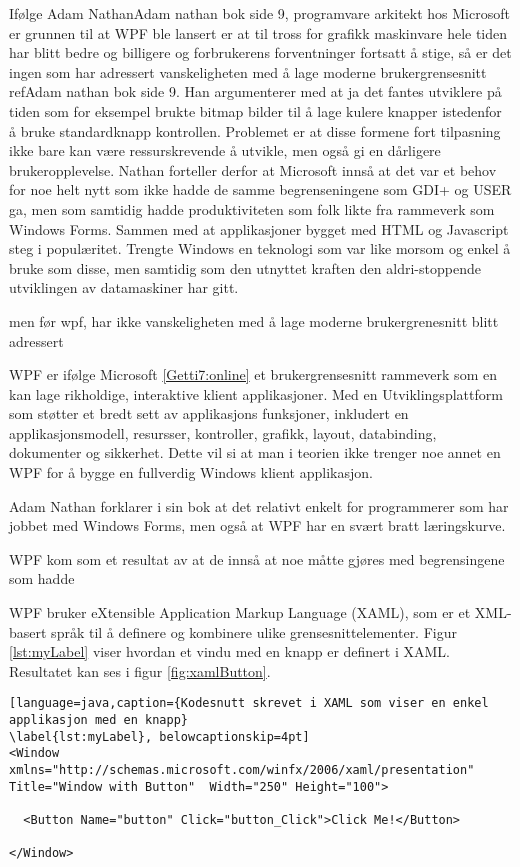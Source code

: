Ifølge Adam Nathan{Adam nathan bok side 9}, programvare arkitekt hos Microsoft er grunnen til at WPF ble lansert er at til tross for grafikk maskinvare hele tiden har blitt bedre og billigere og  forbrukerens forventninger fortsatt å stige, så er det ingen som har adressert vanskeligheten med å lage moderne brukergrensesnitt ref{Adam nathan bok side 9}.  Han argumenterer med at ja det fantes utviklere på tiden som for eksempel brukte bitmap bilder til å lage kulere knapper istedenfor å bruke standardknapp kontrollen. Problemet er at disse formene fort tilpasning ikke bare kan være ressurskrevende å utvikle, men også gi en dårligere brukeropplevelse. Nathan forteller derfor at Microsoft innså at det var et behov for noe helt nytt som ikke hadde de samme begrenseningene som GDI+ og USER ga, men som samtidig hadde produktiviteten som folk likte fra rammeverk som Windows Forms. Sammen med at applikasjoner bygget med HTML og Javascript steg i populæritet. Trengte Windows en teknologi som var like morsom og enkel å bruke som disse, men samtidig som den utnyttet kraften den aldri-stoppende utviklingen av datamaskiner har gitt.




men før wpf, har ikke vanskeligheten med å lage moderne brukergrenesnitt blitt adressert  

WPF er ifølge Microsoft \ref{Getti7:online} et brukergrensesnitt rammeverk som en kan lage rikholdige, interaktive klient applikasjoner. Med en Utviklingsplattform som støtter et bredt sett av applikasjons funksjoner, inkludert en applikasjonsmodell, resursser, kontroller, grafikk, layout, databinding, dokumenter og sikkerhet. Dette vil si at man i teorien ikke trenger noe annet en WPF for å bygge en fullverdig Windows klient applikasjon. 


Adam Nathan forklarer i sin bok at det relativt enkelt for programmerer som har jobbet med Windows Forms, men også at WPF har en svært bratt læringskurve. 

WPF kom som et resultat av at de innså at noe måtte gjøres med begrensingene som hadde 





 WPF bruker eXtensible Application Markup Language (\gls{XAML}), som er et XML-basert språk til å definere og kombinere ulike grensesnittelementer. Figur \ref{lst:myLabel} viser hvordan et vindu med en knapp er definert i XAML. Resultatet kan ses i figur \ref{fig:xamlButton}. 

\begin{lstlisting}[language=java,caption={Kodesnutt skrevet i XAML som viser en enkel applikasjon med en knapp}
\label{lst:myLabel}, belowcaptionskip=4pt]
<Window xmlns="http://schemas.microsoft.com/winfx/2006/xaml/presentation" Title="Window with Button"  Width="250" Height="100">

  <Button Name="button" Click="button_Click">Click Me!</Button>
  
</Window>
\end{lstlisting}



